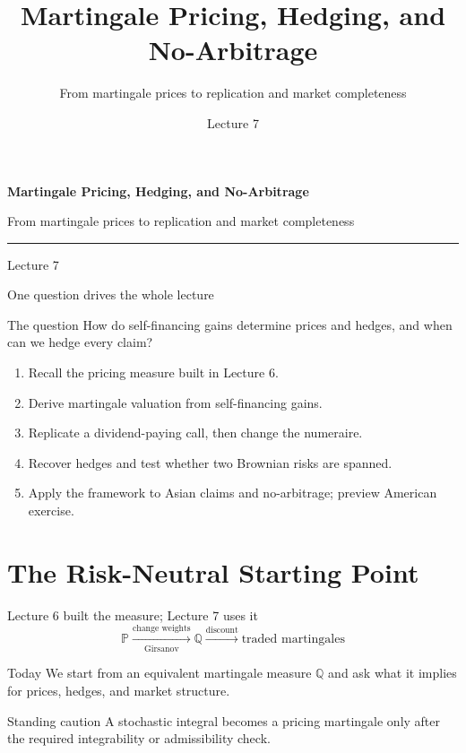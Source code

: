 \documentclass[handout,10pt,aspectratio=169]{beamer}
\title{Martingale Pricing, Hedging, and No-Arbitrage}
\subtitle{From martingale prices to replication and market completeness}
\author{}
\date{Lecture 7}
\newcommand{\Pp}{\mathbb P}
\newcommand{\Q}{\mathbb Q}
\newcommand{\1}{\mathbf 1}
\begin{document}
\begin{frame}[plain]
  \vfill
  {\LARGE\bfseries\color{CourseBlue}Martingale Pricing, Hedging, and No-Arbitrage\par}
  \medskip
  {\large From martingale prices to replication and market completeness\par}
  \medskip
  {\color{CourseGold}\rule{0.94\textwidth}{0.8pt}}
  \medskip
  {Lecture 7\par}
  \vfill
\end{frame}

\begin{frame}{One question drives the whole lecture}
\begin{block}{The question}
How do self-financing gains determine prices and hedges, and when can we
hedge every claim?
\end{block}
\begin{enumerate}
  \item Recall the pricing measure built in Lecture 6.
  \item Derive martingale valuation from self-financing gains.
  \item Replicate a dividend-paying call, then change the numeraire.
  \item Recover hedges and test whether two Brownian risks are spanned.
  \item Apply the framework to Asian claims and no-arbitrage; preview American exercise.
\end{enumerate}
\end{frame}

\section{The Risk-Neutral Starting Point}

\begin{frame}{Lecture 6 built the measure; Lecture 7 uses it}
\[
\boxed{
\Pp
\xrightarrow[\text{Girsanov}]{\text{change weights}}
\Q
\xrightarrow{\text{discount}}
\text{traded martingales}}
\]
\begin{block}{Today}
We start from an equivalent martingale measure \(\Q\) and ask what it implies
for prices, hedges, and market structure.
\end{block}
\begin{alertblock}{Standing caution}
A stochastic integral becomes a pricing martingale only after the required
integrability or admissibility check.
\end{alertblock}
\end{frame}
\end{document}
